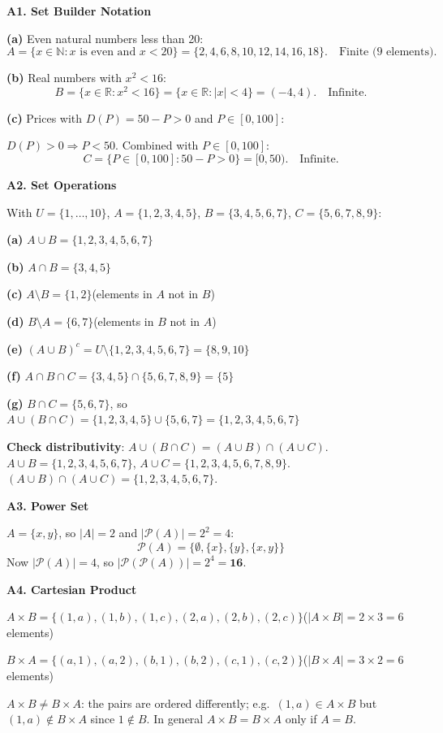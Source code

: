 \documentclass[12pt, a4paper]{article}
\theoremstyle{definition}
\newcommand{\R}{\mathbb{R}}
\newcommand{\N}{\mathbb{N}}
\newcommand{\powerset}{\mathcal{P}}
\begin{document}
\begin{solbox}
\textbf{A1. Set Builder Notation}

\textbf{(a)} Even natural numbers less than 20:
\[A = \{x \in \N : x \text{ is even and } x < 20\} = \{2, 4, 6, 8, 10, 12, 14, 16, 18\}.\quad\text{Finite (9 elements).}\]

\textbf{(b)} Real numbers with $x^2 < 16$:
\[B = \{x \in \R : x^2 < 16\} = \{x \in \R : |x| < 4\} = (-4, 4).\quad\text{Infinite.}\]

\textbf{(c)} Prices with $D(P) = 50 - P > 0$ and $P \in [0,100]$:

$D(P) > 0 \Rightarrow P < 50$. Combined with $P \in [0,100]$:
\[C = \{P \in [0,100] : 50 - P > 0\} = [0, 50).\quad\text{Infinite.}\]
\end{solbox}

\begin{solbox}
\textbf{A2. Set Operations}

With $U=\{1,\ldots,10\}$, $A=\{1,2,3,4,5\}$, $B=\{3,4,5,6,7\}$, $C=\{5,6,7,8,9\}$:

\textbf{(a)} $A \cup B = \{1,2,3,4,5,6,7\}$

\textbf{(b)} $A \cap B = \{3,4,5\}$

\textbf{(c)} $A \setminus B = \{1,2\}$\quad (elements in $A$ not in $B$)

\textbf{(d)} $B \setminus A = \{6,7\}$\quad (elements in $B$ not in $A$)

\textbf{(e)} $(A \cup B)^c = U \setminus \{1,2,3,4,5,6,7\} = \{8,9,10\}$

\textbf{(f)} $A \cap B \cap C = \{3,4,5\} \cap \{5,6,7,8,9\} = \{5\}$

\textbf{(g)} $B \cap C = \{5,6,7\}$, so $A \cup (B \cap C) = \{1,2,3,4,5\} \cup \{5,6,7\} = \{1,2,3,4,5,6,7\}$

\textbf{Check distributivity}: $A \cup (B \cap C) = (A \cup B) \cap (A \cup C)$.
$A \cup B = \{1,2,3,4,5,6,7\}$, $A \cup C = \{1,2,3,4,5,6,7,8,9\}$.
$(A\cup B)\cap(A\cup C) = \{1,2,3,4,5,6,7\}$. \checkmark
\end{solbox}

\begin{solbox}
\textbf{A3. Power Set}

$A = \{x, y\}$, so $|A|=2$ and $|\powerset(A)| = 2^2 = 4$:
\[\powerset(A) = \{\emptyset, \{x\}, \{y\}, \{x,y\}\}\]
Now $|\powerset(A)| = 4$, so $|\powerset(\powerset(A))| = 2^4 = \mathbf{16}$.
\end{solbox}
\newpage
\begin{solbox}
\textbf{A4. Cartesian Product}

$A\times B = \{(1,a),(1,b),(1,c),(2,a),(2,b),(2,c)\}$\quad ($|A\times B| = 2\times 3 = 6$ elements)

$B\times A = \{(a,1),(a,2),(b,1),(b,2),(c,1),(c,2)\}$\quad ($|B\times A| = 3\times 2 = 6$ elements)

$A\times B \neq B\times A$: the pairs are ordered differently; e.g.\ $(1,a)\in A\times B$ but $(1,a)\notin B\times A$ since $1\notin B$. In general $A\times B = B\times A$ only if $A = B$.
\end{solbox}
\end{document}
